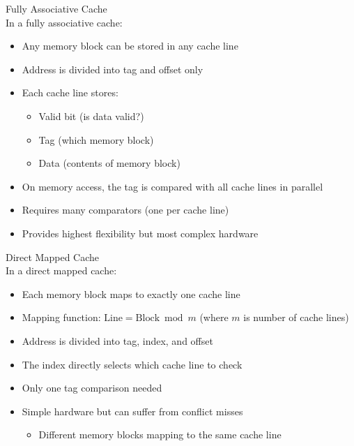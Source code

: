 \begin{concept}{Fully Associative Cache}\\
In a fully associative cache:
\begin{itemize}
    \item Any memory block can be stored in any cache line
    \item Address is divided into tag and offset only
    \item Each cache line stores:
    \begin{itemize}
        \item Valid bit (is data valid?)
        \item Tag (which memory block)
        \item Data (contents of memory block)
    \end{itemize}
    \item On memory access, the tag is compared with all cache lines in parallel
    \item Requires many comparators (one per cache line)
    \item Provides highest flexibility but most complex hardware
\end{itemize}
\end{concept}

\begin{concept}{Direct Mapped Cache}\\
In a direct mapped cache:
\begin{itemize}
    \item Each memory block maps to exactly one cache line
    \item Mapping function: $\text{Line} = \text{Block} \bmod m$ (where $m$ is number of cache lines)
    \item Address is divided into tag, index, and offset
    \item The index directly selects which cache line to check
    \item Only one tag comparison needed
    \item Simple hardware but can suffer from conflict misses
    \begin{itemize}
        \item Different memory blocks mapping to the same cache line
    \end{itemize}
\end{itemize}
\end{concept}


